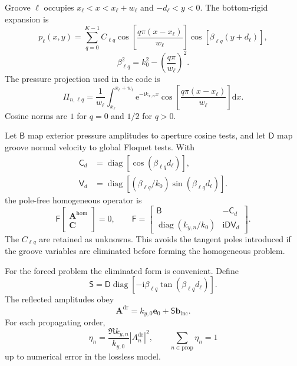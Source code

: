 \documentclass[aps,prl,reprint,superscriptaddress,nofootinbib,floatfix]{revtex4-2}
\newcommand{\ii}{\mathrm{i}}
\newcommand{\e}{\mathrm{e}}
\providecommand{\hom}{\mathrm{hom}}
\providecommand{\dr}{\mathrm{dr}}
\begin{document}
Groove $\ell$ occupies $x_\ell<x<x_\ell+w_\ell$ and
$-d_\ell<y<0$.  The bottom-rigid expansion is
\begin{equation}
 p_\ell(x,y)=\sum_{q=0}^{K-1}C_{\ell q}
 \cos\!\left[\frac{q\pi(x-x_\ell)}{w_\ell}\right]
 \cos[\beta_{\ell q}(y+d_\ell)],                                    \label{eq:s-groove}
\end{equation}
\begin{equation}
 \beta_{\ell q}^2=k_0^2-\left(\frac{q\pi}{w_\ell}\right)^2.          \label{eq:s-beta}
\end{equation}
The pressure projection used in the code is
\begin{equation}
 \Pi_{n,\ell q}=\frac{1}{w_\ell}
 \int_{x_\ell}^{x_\ell+w_\ell}
 \e^{-\ii k_{x,n}x}
 \cos\!\left[\frac{q\pi(x-x_\ell)}{w_\ell}\right]\mathrm{d}x.      \label{eq:s-proj}
\end{equation}
Cosine norms are $1$ for $q=0$ and $1/2$ for $q>0$.

Let $\mathsf B$ map exterior pressure amplitudes to aperture cosine tests,
and let $\mathsf D$ map groove normal velocity to global Floquet tests.  With
\begin{align}
 \mathsf C_d&=\operatorname{diag}[\cos(\beta_{\ell q}d_\ell)],\nonumber\\
 \mathsf V_d&=\operatorname{diag}[(\beta_{\ell q}/k_0)
 \sin(\beta_{\ell q}d_\ell)].                                      \label{eq:s-cv}
\end{align}
the pole-free homogeneous operator is
\begin{equation}
 \mathsf F
 \begin{bmatrix}\bm A^{\hom}\\ \bm C\end{bmatrix}=0,
 \qquad
 \mathsf F=
 \begin{bmatrix}
   \mathsf B&-\mathsf C_d\\
   \operatorname{diag}(k_{y,n}/k_0)&\ii\mathsf D\mathsf V_d
 \end{bmatrix}.                                                       \label{eq:s-block}
\end{equation}
The $C_{\ell q}$ are retained as unknowns.  This avoids the tangent poles
introduced if the groove variables are eliminated before forming the
homogeneous problem.

For the forced problem the eliminated form is convenient.  Define
\begin{equation}
 \mathsf S=\mathsf D\operatorname{diag}
 [-\ii\beta_{\ell q}\tan(\beta_{\ell q}d_\ell)].                       \label{eq:s-adm}
\end{equation}
The reflected amplitudes obey
\begin{equation}
 [\operatorname{diag}(k_{y,n})-\mathsf S\mathsf B]\bm A^{\dr}
 =k_{y,0}\bm e_0+\mathsf S\bm b_{\mathrm{inc}}.                       \label{eq:s-driven}
\end{equation}
For each propagating order,
\begin{equation}
 \eta_n=\frac{\Re k_{y,n}}{k_{y,0}}|A_n^{\dr}|^2,\qquad
 \sum_{n\in\mathrm{prop}}\eta_n=1                                   \label{eq:s-eta}
\end{equation}
up to numerical error in the lossless model.
\end{document}
